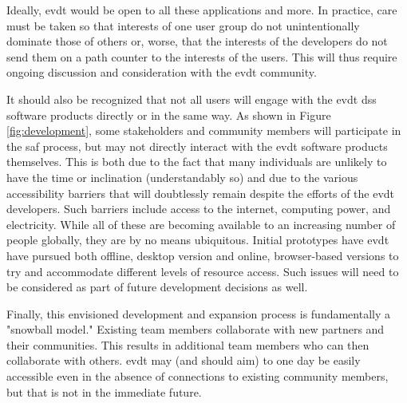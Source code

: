 Ideally, \ac{evdt} would be open to all these applications and more. In practice, care must be taken so that interests of one user group do not unintentionally dominate those of others or, worse, that the interests of the developers do not send them on a path counter to the interests of the users. This will thus require ongoing discussion and consideration with the \ac{evdt} community.

It should also be recognized that not all users will engage with the \ac{evdt} \ac{dss} software products directly or in the same way. As shown in Figure \ref{fig:development}, some stakeholders and community members will participate in the \ac{saf} process, but may not directly interact with the \ac{evdt} software products themselves. This is both due to the fact that many individuals are unlikely to have the time or inclination (understandably so) and due to the various accessibility barriers that will doubtlessly remain despite the efforts of the \ac{evdt} developers. Such barriers include access to the internet, computing power, and electricity. While all of these are becoming available to an increasing number of people globally, they are by no means ubiquitous. Initial prototypes have \ac{evdt} have pursued both offline, desktop version and online, browser-based versions to try and accommodate different levels of resource access. Such issues will need to be considered as part of future development decisions as well.

Finally, this envisioned development and expansion process is fundamentally a "snowball model." Existing team members collaborate with new partners and their communities. This results in additional team members who can then collaborate with others. \ac{evdt} may (and should aim) to one day be easily accessible even in the absence of connections to existing community members, but that is not in the immediate future.

